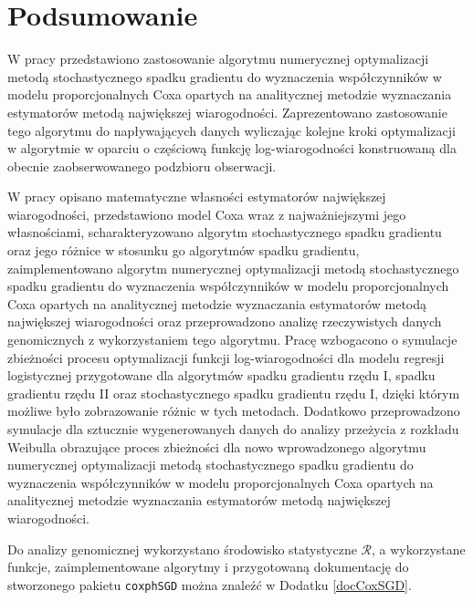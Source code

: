 \chapter*{Podsumowanie}
W pracy przedstawiono zastosowanie algorytmu numerycznej optymalizacji metodą stochastycznego spadku gradientu do wyznaczenia współczynników w modelu proporcjonalnych Coxa opartych na analitycznej metodzie wyznaczania estymatorów metodą największej wiarogodności. Zaprezentowano zastosowanie tego algorytmu do napływających danych wyliczając kolejne kroki optymalizacji w algorytmie w oparciu o częściową funkcję log-wiarogodności konstruowaną dla obecnie zaobserwowanego podzbioru obserwacji.

W pracy opisano matematyczne własności estymatorów największej wiarogodności, przedstawiono model Coxa wraz z najważniejszymi jego własnościami, scharakteryzowano algorytm stochastycznego spadku gradientu oraz jego różnice w stosunku go algorytmów spadku gradientu, zaimplementowano algorytm numerycznej optymalizacji metodą stochastycznego spadku gradientu do wyznaczenia współczynników w modelu proporcjonalnych Coxa opartych na analitycznej metodzie wyznaczania estymatorów metodą największej wiarogodności oraz przeprowadzono analizę rzeczywistych danych genomicznych z wykorzystaniem tego algorytmu. Pracę wzbogacono o symulacje zbieżności procesu optymalizacji funkcji log-wiarogodności dla modelu regresji logistycznej przygotowane dla algorytmów spadku gradientu rzędu I, spadku gradientu rzędu II oraz stochastycznego spadku gradientu rzędu I, dzięki którym możliwe było zobrazowanie różnic w tych metodach. Dodatkowo przeprowadzono symulacje dla sztucznie wygenerowanych danych do analizy przeżycia z rozkładu Weibulla obrazujące proces zbieżności dla nowo wprowadzonego algorytmu numerycznej optymalizacji metodą stochastycznego spadku gradientu do wyznaczenia współczynników w modelu proporcjonalnych Coxa opartych na analitycznej metodzie wyznaczania estymatorów metodą największej wiarogodności.

Do analizy genomicznej wykorzystano środowisko statystyczne $\mathcal{R}$, a wykorzystane funkcje, zaimplementowane algorytmy i przygotowaną dokumentację do stworzonego pakietu \texttt{coxphSGD} można znaleźć w Dodatku \ref{docCoxSGD}.
